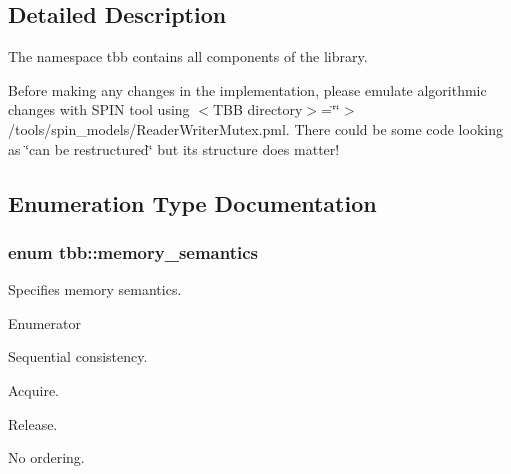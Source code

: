 \subsection{Detailed Description}
The namespace tbb contains all components of the library. 

Before making any changes in the implementation, please emulate algorithmic changes with S\+P\+I\+N tool using $<$\+T\+B\+B directory$>$=\char`\"{}\char`\"{}$>$/tools/spin\+\_\+models/\+Reader\+Writer\+Mutex.pml. There could be some code looking as \char`\"{}can be restructured\char`\"{} but its structure does matter! 

\subsection{Enumeration Type Documentation}
\hypertarget{namespacetbb_adb86d08473679d6fe0eabcdc766ffe3a}{}
\subsubsection[{memory\+\_\+semantics}]{\setlength{\rightskip}{0pt plus 5cm}enum {\bf tbb\+::memory\+\_\+semantics}}\label{namespacetbb_adb86d08473679d6fe0eabcdc766ffe3a}


Specifies memory semantics. 

\begin{Desc}
\item[Enumerator]\par
\begin{description}
\item[{\em 
\hypertarget{namespacetbb_adb86d08473679d6fe0eabcdc766ffe3aa6a315190cf4509ec388ecb423432f36a}{}full\+\_\+fence\label{namespacetbb_adb86d08473679d6fe0eabcdc766ffe3aa6a315190cf4509ec388ecb423432f36a}
}]Sequential consistency. \item[{\em 
\hypertarget{namespacetbb_adb86d08473679d6fe0eabcdc766ffe3aaa92646b4dc7618530d3a9f51dd10a418}{}acquire\label{namespacetbb_adb86d08473679d6fe0eabcdc766ffe3aaa92646b4dc7618530d3a9f51dd10a418}
}]Acquire. \item[{\em 
\hypertarget{namespacetbb_adb86d08473679d6fe0eabcdc766ffe3aa412563418e657114a102db610f726632}{}release\label{namespacetbb_adb86d08473679d6fe0eabcdc766ffe3aa412563418e657114a102db610f726632}
}]Release. \item[{\em 
\hypertarget{namespacetbb_adb86d08473679d6fe0eabcdc766ffe3aa73cb2e2bcb94442b8b2b72e93a76f2e5}{}relaxed\label{namespacetbb_adb86d08473679d6fe0eabcdc766ffe3aa73cb2e2bcb94442b8b2b72e93a76f2e5}
}]No ordering. \end{description}
\end{Desc}


